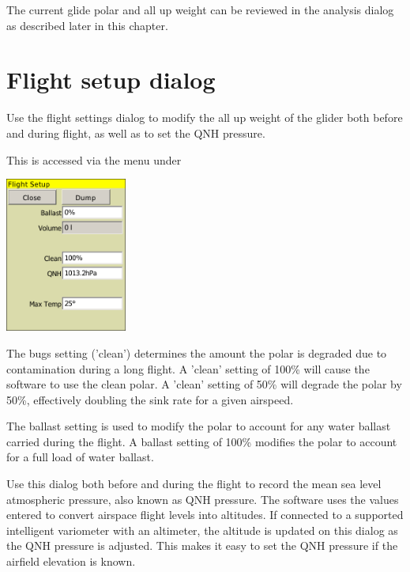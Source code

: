 \documentclass[a4paper,12pt]{refrep}
\begin{document}

The current glide polar and all up weight can be reviewed in the
analysis dialog as described later in this chapter.

\section{Flight setup dialog}\label{sec:basic-sett-dial}
Use the flight settings dialog to modify the all up weight of the glider both
before and during flight, as well as to set the QNH pressure.  

This is accessed via the menu under 
\begin{quote}
\blink{}
\end{quote}

\begin{center}
\includegraphics[angle=0,width=4cm,keepaspectratio='true']{figures/dialog-basicsettings.png}
\end{center}

The bugs setting ('clean') determines the amount the polar is degraded
due to contamination during a long flight.  A 'clean' setting of 100\%
will cause the software to use the clean polar. A 'clean' setting of
50\% will degrade the polar by 50\%, effectively doubling the sink
rate for a given airspeed.

The ballast setting is used to modify the polar to account for any
water ballast carried during the flight. A ballast setting of 100\%
modifies the polar to account for a full load of water ballast.  

Use this dialog both before and during the flight to record the mean
sea level atmospheric pressure, also known as QNH pressure.  The
software uses the values entered to convert airspace flight levels
into altitudes.  If connected to a supported intelligent variometer
with an altimeter, the altitude is updated on this dialog as the QNH
pressure is adjusted.  This makes it easy to set the QNH pressure if
the airfield elevation is known.
\end{document}
